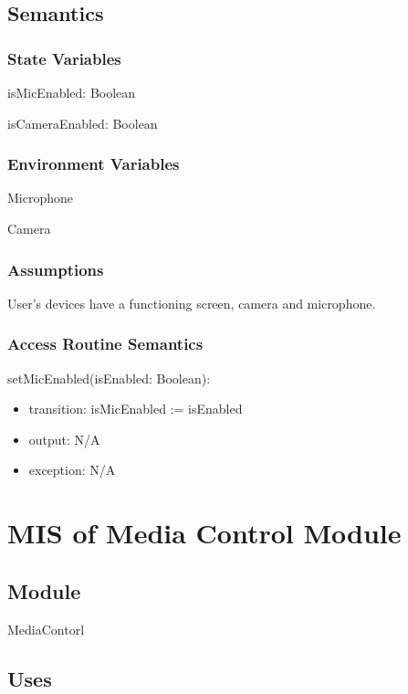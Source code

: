 \documentclass[12pt, titlepage]{article}
\begin{document}
\subsection{Semantics}

\subsubsection{State Variables}

\noindent isMicEnabled: Boolean

\noindent isCameraEnabled: Boolean

\subsubsection{Environment Variables}

\noindent Microphone

\noindent Camera

\subsubsection{Assumptions}

User's devices have a functioning screen, camera and microphone.

\subsubsection{Access Routine Semantics}

\noindent setMicEnabled(isEnabled: Boolean):
\begin{itemize}
\item transition: isMicEnabled := isEnabled
\item output: N/A
\item exception: N/A
\end{itemize}

\section{MIS of Media Control Module} \label{sec:mediactrl}

\subsection{Module}

MediaContorl

\subsection{Uses}
\end{document}
